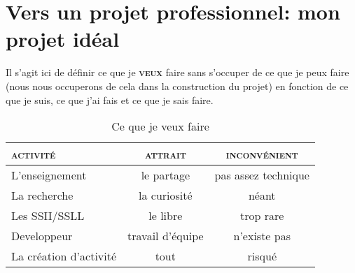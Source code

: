 \documentclass[a4paper,12pt, draft]{report}
\newcommand{\tabTitle}[1]{\hfill{} \textsc{#1} \hfill{} }
\begin{document}
\chapter[Mon projet idéal]{Vers un projet professionnel: mon projet idéal}
Il s'agit ici de définir ce que je \textsc{\textbf{veux}} faire sans s'occuper de ce que je peux faire (nous nous occuperons de cela dans la construction du projet) en fonction de ce que je suis, ce que j'ai fais et ce que je sais faire.


\begin{table}[h]
\begin{center}
\begin{tabular}{|l|c|c|}
  \hline
  \tabTitle{activité} & \tabTitle{attrait} & \tabTitle{inconvénient}\\
  \hline
  \hline
  L'enseignement & le partage & pas assez technique\\
  \hline
  La recherche & la curiosité & néant \\
  \hline
  Les SSII\footnotemark{}/SSLL\footnotemark{} & le libre & trop rare\\
  \hline
  Developpeur & travail d'équipe & n'existe pas\footnotemark{}\\
  \hline
  La création d'activité & tout & risqué\\
  \hline
\end{tabular}
\end{center}
\caption{Ce que je veux faire}
\end{table}

\end{document}

